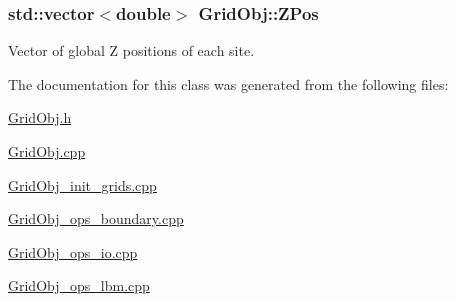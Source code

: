 \subsubsection[{\texorpdfstring{Z\+Pos}{ZPos}}]{\setlength{\rightskip}{0pt plus 5cm}std\+::vector$<$double$>$ Grid\+Obj\+::\+Z\+Pos}\hypertarget{class_grid_obj_af859d35bf0a03cee8965ce3e22e651c6}{}\label{class_grid_obj_af859d35bf0a03cee8965ce3e22e651c6}


Vector of global Z positions of each site. 



The documentation for this class was generated from the following files\+:\begin{DoxyCompactItemize}
\item 
\hyperlink{_grid_obj_8h}{Grid\+Obj.\+h}\item 
\hyperlink{_grid_obj_8cpp}{Grid\+Obj.\+cpp}\item 
\hyperlink{_grid_obj__init__grids_8cpp}{Grid\+Obj\+\_\+init\+\_\+grids.\+cpp}\item 
\hyperlink{_grid_obj__ops__boundary_8cpp}{Grid\+Obj\+\_\+ops\+\_\+boundary.\+cpp}\item 
\hyperlink{_grid_obj__ops__io_8cpp}{Grid\+Obj\+\_\+ops\+\_\+io.\+cpp}\item 
\hyperlink{_grid_obj__ops__lbm_8cpp}{Grid\+Obj\+\_\+ops\+\_\+lbm.\+cpp}\end{DoxyCompactItemize}
